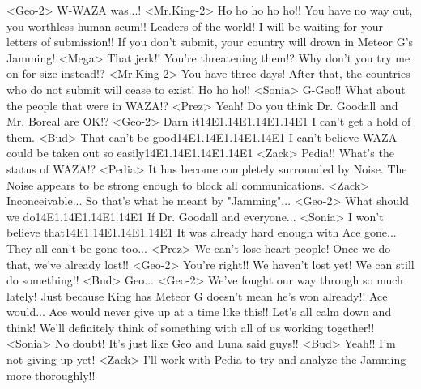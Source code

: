<Geo-2> W-WAZA was...! 
<Mr.King-2> Ho ho ho ho ho!! 
You have no way out, you worthless human scum!! 
Leaders of the world! I will be waiting for your letters of submission!! 
If you don't submit, your country will drown in Meteor G's Jamming! 
<Mega> That jerk!! You're threatening them!? 
Why don't you try me on for size instead!? 
<Mr.King-2> You have three days! 
After that, the countries who do not submit will cease to exist! 
Ho ho ho!! 
<Sonia> G-Geo!! What about the people that were in WAZA!? 
<Prez> Yeah! Do you think Dr. Goodall and Mr. Boreal are OK!? 
<Geo-2> Darn it{14}{E1}.{14}{E1}.{14}{E1}.{14}{E1} I can't get a hold of them. 
<Bud> That can't be good{14}{E1}.{14}{E1}.{14}{E1}.{14}{E1} I can't believe WAZA could be taken out so easily{14}{E1}.{14}{E1}.{14}{E1}.{14}{E1} 
<Zack> Pedia!! What's the status of WAZA!? 
<Pedia> It has become completely surrounded by Noise. 
The Noise appears to be strong enough to block all communications. 
<Zack> Inconceivable... 
So that's what he meant by "Jamming"... 
<Geo-2> What should we do{14}{E1}.{14}{E1}.{14}{E1}.{14}{E1} If Dr. Goodall and everyone... 
<Sonia> I won't believe that{14}{E1}.{14}{E1}.{14}{E1}.{14}{E1} It was already hard enough with Ace gone... 
They all can't be gone too... 
<Prez> We can't lose heart people! 
Once we do that, we've already lost!! 
<Geo-2> You're right!! 
We haven't lost yet! We can still do something!! 
<Bud> Geo... 
<Geo-2> We've fought our way through so much lately! 
Just because King has Meteor G doesn't mean he's won already!! 
Ace would... Ace would never give up at a time like this!! 
Let's all calm down and think! 
We'll definitely think of something with all of us working together!! 
<Sonia> No doubt! 
It's just like Geo and Luna said guys!! 
<Bud> Yeah!! I'm not giving up yet! 
<Zack> I'll work with Pedia to try and analyze the Jamming more thoroughly!! 
